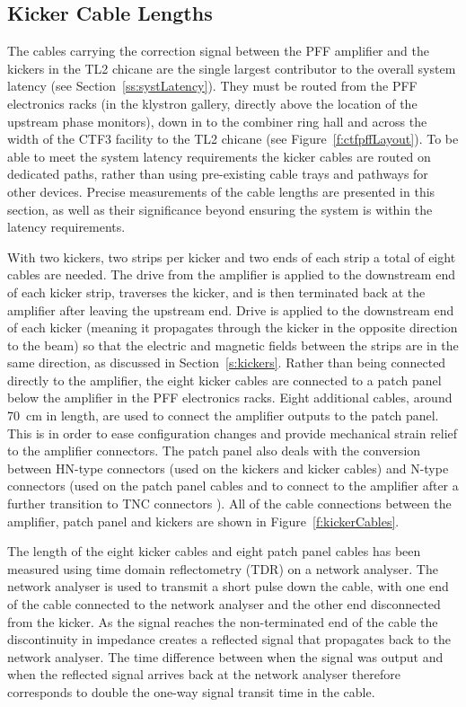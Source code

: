 \subsection{Kicker Cable Lengths}
\label{ss:kickerCables}

The cables carrying the correction signal between the PFF amplifier and the kickers in the TL2 chicane are the single largest contributor to the overall system latency (see Section~\ref{ss:systLatency}). They must be routed from the PFF electronics racks (in the klystron gallery, directly above the location of the upstream phase monitors), down in to the combiner ring hall and across the width of the CTF3 facility to the TL2 chicane (see Figure~\ref{f:ctfpffLayout}). 
To be able to meet the system latency requirements the kicker cables are routed on dedicated paths, rather than using pre-existing cable trays and pathways for other devices. Precise measurements of the cable lengths are presented in this section, as well as their significance beyond ensuring the system is within the latency requirements.

With two kickers, two strips per kicker and two ends of each strip a total of eight cables are needed. The drive from the amplifier is applied to the downstream end of each kicker strip, traverses the kicker, and is then terminated back at the amplifier after leaving the upstream end. Drive is applied to the downstream end of each kicker (meaning it propagates through the kicker in the opposite direction to the beam) so that the electric and magnetic fields between the strips are in the same direction, as discussed in Section~\ref{s:kickers}. Rather than being connected directly to the amplifier, the eight kicker cables are connected to a patch panel below the amplifier in the PFF electronics racks. Eight additional cables, around 70~cm in length, are used to connect the amplifier outputs to the patch panel. This is in order to ease configuration changes and provide mechanical strain relief to the amplifier connectors. The patch panel also deals with the conversion between HN-type connectors (used on the kickers and kicker cables) and N-type connectors (used on the patch panel cables and to connect to the amplifier after a further transition to TNC connectors \cite{colinCLIC16}). All of the cable connections between the amplifier, patch panel and kickers are shown in Figure~\ref{f:kickerCables}.

The length of the eight kicker cables and eight patch panel cables has been measured using time domain reflectometry (TDR) on a network analyser. The network analyser is used to transmit a short pulse down the cable,  with one end of the cable connected to the network analyser and the other end disconnected from the kicker. As the signal reaches the non-terminated end of the cable the discontinuity in impedance creates a reflected signal that propagates back to the network analyser. The time difference between when the signal was output and when the reflected signal arrives back at the network analyser therefore corresponds to double the one-way signal transit time in the cable.

